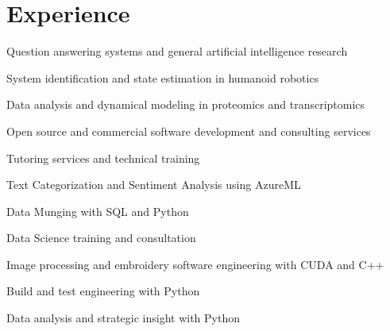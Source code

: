\documentclass[letterpaper]{deedy-resume} %
\begin{document}
\begin{minipage}[t]{0.66\textwidth} %


\section{Experience}

\vspace{\topsep}
\begin{tightitemize}
\item Question answering systems and general artificial intelligence research
\item System identification and state estimation in humanoid robotics
\item Data analysis and dynamical modeling in proteomics and transcriptomics
\item Open source and commercial software development and consulting services
\item Tutoring services and technical training
\end{tightitemize}

\sectionspace

\begin{tightitemize}
\item Text Categorization and Sentiment Analysis using AzureML
\item Data Munging with SQL and Python
\item Data Science training and consultation
\end{tightitemize}

\sectionspace


\begin{tightitemize}
\item Image processing and embroidery software engineering with CUDA and C++
\item Build and test engineering with Python
\item Data analysis and strategic insight with Python


\end{tightitemize}
\end{minipage}
\end{document}
